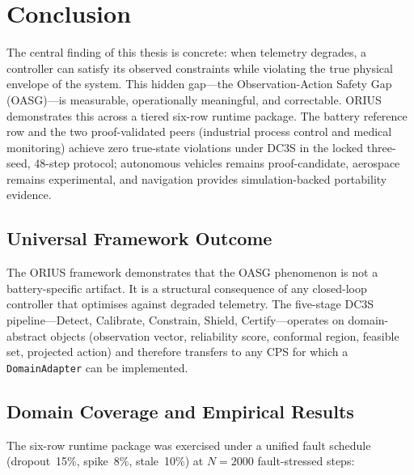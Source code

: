 \section{Conclusion}
\label{ch:conclusion}

The central finding of this thesis is concrete: when telemetry degrades,
a controller can satisfy its observed constraints while violating the true
physical envelope of the system.  This hidden gap---the
Observation-Action Safety Gap (OASG)---is measurable, operationally
meaningful, and correctable.  ORIUS demonstrates this across a tiered
six-row runtime package.  The battery reference row and the two
proof-validated peers (industrial process control and medical monitoring)
achieve zero true-state violations under DC3S in the locked three-seed,
48-step protocol; autonomous vehicles remains proof-candidate, aerospace
remains experimental, and navigation provides simulation-backed portability
evidence.

\subsection{Universal Framework Outcome}

The ORIUS framework demonstrates that the OASG phenomenon is not a
battery-specific artifact.  It is a structural consequence of any
closed-loop controller that optimises against degraded telemetry.  The
five-stage DC3S pipeline---Detect, Calibrate, Constrain, Shield,
Certify---operates on domain-abstract objects (observation vector,
reliability score, conformal region, feasible set, projected action) and
therefore transfers to any CPS for which a \texttt{DomainAdapter} can be
implemented.

\subsection{Domain Coverage and Empirical Results}

The six-row runtime package was exercised under a unified fault schedule
(dropout~15\%, spike~8\%, stale~10\%) at $N = 2000$ fault-stressed steps:

